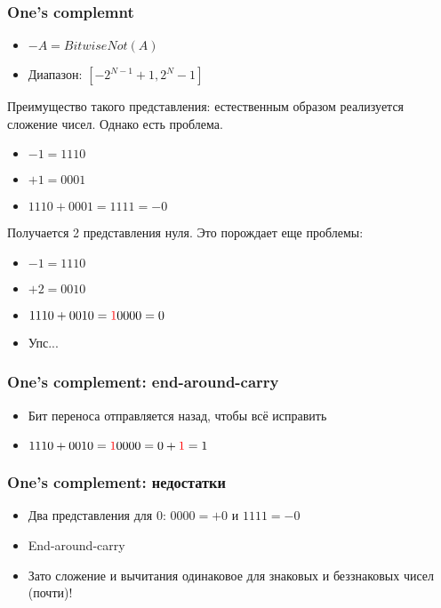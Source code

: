   \subsubsection{One's complemnt}
    \begin{itemize}
      \item $-A = BitwiseNot(A)$
      \item Диапазон: $[-2^{N - 1} + 1, 2^N - 1]$
    \end{itemize}
    Преимущество такого представления: естественным образом реализуется сложение чисел. Однако есть проблема.
    \begin{itemize}
      \item $-1 = 1110$
      \item $+1 = 0001$
      \item $1110 + 0001 = 1111 = -0$
    \end{itemize}
    Получается 2 представления нуля. Это порождает еще проблемы:
    \begin{itemize}
      \item $-1 = 1110$
      \item $+2 = 0010$
      \item $1110 + 0010 = \textcolor{red}{1}0000 = 0$
      \item Упс...
    \end{itemize}
  
  \subsubsection*{One's complement: end-around-carry}
    \begin{itemize}
      \item Бит переноса отправляется назад, чтобы всё исправить
      \item $1110 + 0010 = \textcolor{red}{1}0000 = 0 + \textcolor{red}{1} = 1$
    \end{itemize}
  
  \subsubsection*{One's complement: недостатки}
    \begin{itemize}
      \item Два представления для $0$: $0000 = +0$ и $1111 = -0$
      \item End-around-carry
      \item Зато сложение и вычитания одинаковое для знаковых и беззнаковых чисел (почти)!
    \end{itemize}
  
